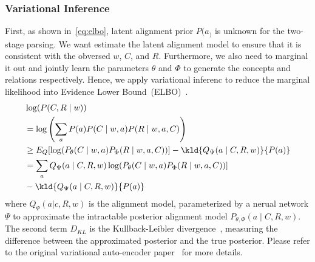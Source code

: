 \subsubsection{Variational Inference}
\label{sssec:lex-phr:vae}
First, as shown in~\autoref{eq:elbo}, latent alignment prior $P(a_)$
is unknown for the two-stage parsing. We want estimate the latent
alignment model to ensure that it is consistent with the obversed $w$,
$C$, and $R$. Furthermore, we also need to marginal it out and jointly
learn the parameters $\theta$ and $\Phi$ to generate the concepts and
relations respectively. Hence, we apply variational inferenc to reduce
the marginal likelihood into Evidence Lower
Bound~(ELBO)~\citep{kingma2013auto}.
\begin{equation}
 \label{eq:elbo}
\begin{aligned}
  & \log(P(C,R \mid w)) \\
  & = \log\left(\sum_{a}P(a) P(C\mid w, a) P(R\mid w,a,C)\right) \\
  & \ge E_{Q}[\log(P_{\theta}(C\mid w,a) P_{\Phi}(R\mid w,a,C))] - \kld{Q_{\Psi}(a\mid C, R,w)}{P(a)} \\
  & = \sum_{a}Q_{\Psi}(a\mid C, R,w)\log(P_{\theta}(C\mid w,a) P_{\Phi}(R\mid w,a,C))] \\
  & - \kld{Q_{\Psi}(a\mid C, R,w)}{P(a)}
\end{aligned}
\end{equation}
where $Q_{\Psi}(a|c,R,w)$ is the alignment model, parameterized by a
nerual network $\Psi$ to approximate the intractable posterior alignment
model $P_{\theta,\Phi}(a\mid C, R, w)$. The second term $D_{{KL}}$ is the
Kullback-Leibler divergence~\citep{kl-ims}, measuring the difference
between the approximated posterior and the true posterior. Please
refer to the original variational auto-encoder
paper~\citep{kingma2013auto} for more details.

